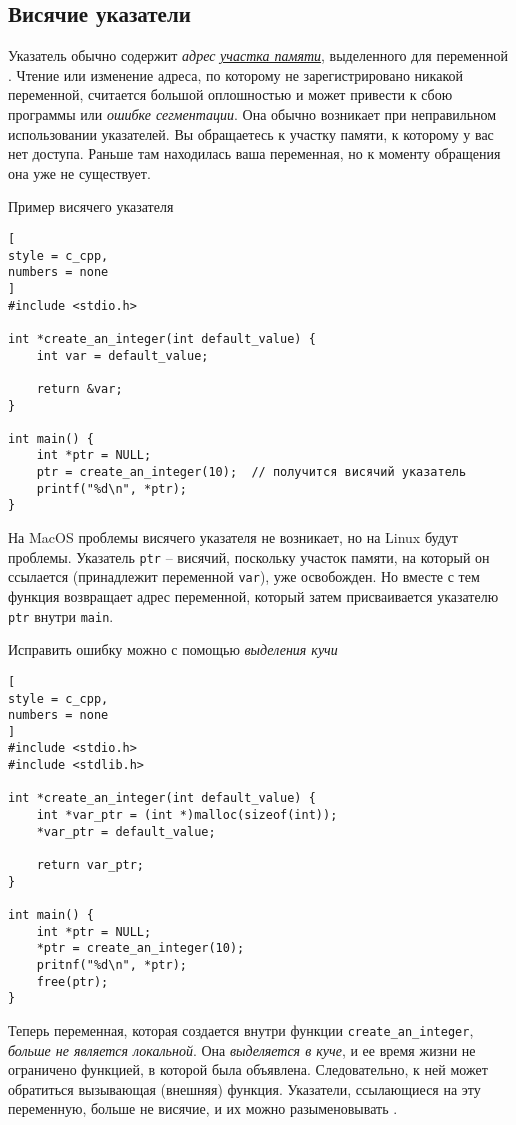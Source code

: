\documentclass[%
	11pt,
	a4paper,
	utf8,
		]{article}
\begin{document}
\subsection{Висячие указатели}

Указатель обычно содержит \emph{адрес} \underline{\itshape участка памяти}, выделенного для переменной \cite[]{amini-extreme-c:2022}. Чтение или изменение адреса, по которому не зарегистрировано никакой переменной, считается большой оплошностью и может привести к сбою программы или \emph{ошибке сегментации}. Она обычно возникает при неправильном использовании указателей. Вы обращаетесь к участку памяти, к которому у вас нет доступа. Раньше там находилась ваша переменная, но к моменту обращения она уже не существует.

Пример висячего указателя
\begin{lstlisting}[
style = c_cpp,
numbers = none
]
#include <stdio.h>

int *create_an_integer(int default_value) {
    int var = default_value;
    
    return &var;
}

int main() {
    int *ptr = NULL;
    ptr = create_an_integer(10);  // получится висячий указатель
    printf("%d\n", *ptr);
}
\end{lstlisting}

На MacOS проблемы висячего указателя не возникает, но на Linux будут проблемы. Указатель \verb|ptr| -- висячий, поскольку участок памяти, на который он ссылается (принадлежит переменной \verb|var|), уже освобожден. Но вместе с тем функция возвращает адрес переменной, который затем присваивается указателю \verb|ptr| внутри \verb|main|.

Исправить ошибку можно с помощью \emph{выделения кучи}
\begin{lstlisting}[
style = c_cpp,
numbers = none	
]
#include <stdio.h>
#include <stdlib.h>

int *create_an_integer(int default_value) {
    int *var_ptr = (int *)malloc(sizeof(int));
    *var_ptr = default_value;
    
    return var_ptr;
}

int main() {
	int *ptr = NULL;
    *ptr = create_an_integer(10);
    pritnf("%d\n", *ptr);
    free(ptr);
}
\end{lstlisting}

Теперь переменная, которая создается внутри функции \verb|create_an_integer|, \emph{больше не является локальной}. Она \emph{выделяется в куче}, и ее время жизни не ограничено функцией, в которой была объявлена. Следовательно, к ней может обратиться вызывающая (внешняя) функция. Указатели, ссылающиеся на эту переменную, больше не висячие, и их можно разыменовывать \cite[]{amini-extreme-c:2022}.
\end{document}
